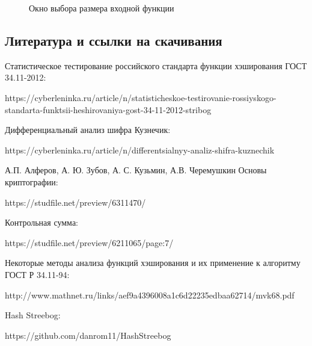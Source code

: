 \documentclass[a4paper,14pt]{report}
\begin{document}
\begin{figure}[h]
\caption{Окно выбора размера входной функции}
\label{fig:image}
\end{figure}

\subsection{Литература и ссылки на скачивания}

Статистическое тестирование российского стандарта функции хэширования ГОСТ 34.11-2012:

https://cyberleninka.ru/article/n/statisticheskoe-testirovanie-rossiyskogo-standarta-funktsii-heshirovaniya-gost-34-11-2012-stribog
 \hfill \break
 
Дифференциальный анализ шифра Кузнечик:

 https://cyberleninka.ru/article/n/differentsialnyy-analiz-shifra-kuznechik
  \hfill \break

 А.П. Алферов, А. Ю. Зубов, А. С. Кузьмин,  А.В. Черемушкин Основы криптографии:
 
  https://studfile.net/preview/6311470/
  \hfill \break
  
Контрольная сумма:

https://studfile.net/preview/6211065/page:7/
 \hfill \break
 
 Некоторые методы анализа 
функций хэширования и их применение к алгоритму ГОСТ 
Р 34.11-94:

http://www.mathnet.ru/links/aef9a4396008a1c6d22235edbaa62714/mvk68.pdf
 \hfill \break
 
 Hash Streebog: 
 
https://github.com/danrom11/HashStreebog
\end{document}
